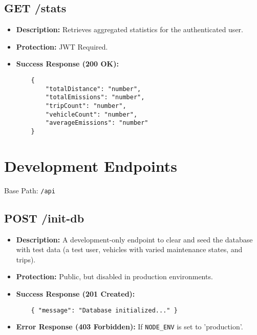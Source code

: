 \subsection{GET /stats}
\begin{itemize}
    \item \textbf{Description:} Retrieves aggregated statistics for the authenticated user.
    \item \textbf{Protection:} JWT Required.
    \item \textbf{Success Response (200 OK):}
    \begin{verbatim}
    {
        "totalDistance": "number",
        "totalEmissions": "number",
        "tripCount": "number",
        "vehicleCount": "number",
        "averageEmissions": "number"
    }
    \end{verbatim}
\end{itemize}

\section{Development Endpoints}
Base Path: \texttt{/api}

\subsection{POST /init-db}
\begin{itemize}
    \item \textbf{Description:} A development-only endpoint to clear and seed the database with test data (a test user, vehicles with varied maintenance states, and trips).
    \item \textbf{Protection:} Public, but disabled in production environments.
    \item \textbf{Success Response (201 Created):}
    \begin{verbatim}
    { "message": "Database initialized..." }
    \end{verbatim}
    \item \textbf{Error Response (403 Forbidden):} If \texttt{NODE\_ENV} is set to 'production'.
\end{itemize}
